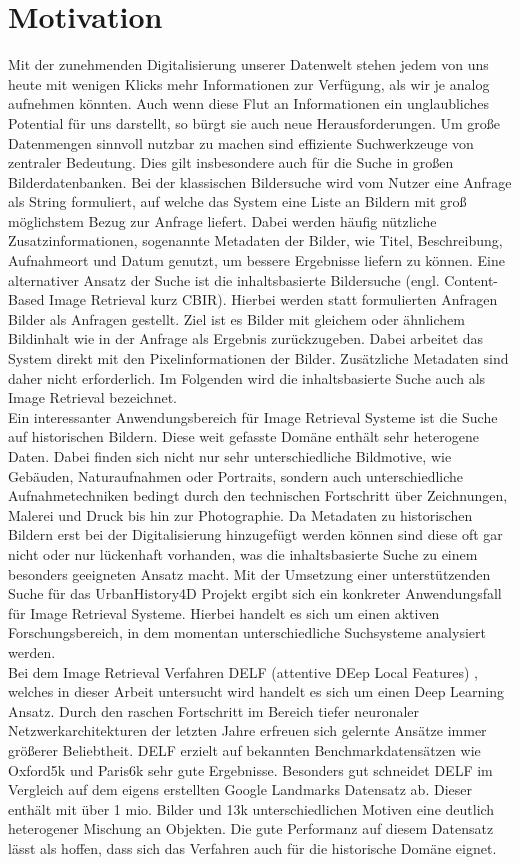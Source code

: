 \section*{Motivation}
Mit der zunehmenden Digitalisierung unserer Datenwelt stehen jedem von uns heute mit wenigen Klicks mehr Informationen zur Verfügung, als wir je analog aufnehmen könnten. Auch wenn diese Flut an Informationen ein unglaubliches Potential für uns darstellt, so bürgt sie auch neue Herausforderungen. Um große Datenmengen sinnvoll nutzbar zu machen sind effiziente Suchwerkzeuge von zentraler Bedeutung. Dies gilt insbesondere auch für die Suche in großen Bilderdatenbanken. Bei der klassischen Bildersuche wird vom Nutzer eine Anfrage als String formuliert, auf welche das System eine Liste an Bildern mit groß möglichstem Bezug zur Anfrage liefert. Dabei werden häufig nützliche  Zusatzinformationen, sogenannte Metadaten der Bilder, wie Titel, Beschreibung, Aufnahmeort und Datum genutzt, um bessere Ergebnisse liefern zu können. Eine alternativer Ansatz der Suche ist die inhaltsbasierte Bildersuche (engl. Content-Based Image Retrieval kurz CBIR). Hierbei werden statt formulierten Anfragen Bilder als Anfragen gestellt. Ziel ist es Bilder mit gleichem oder ähnlichem Bildinhalt wie in der Anfrage als Ergebnis zurückzugeben. Dabei arbeitet das System direkt mit den Pixelinformationen der Bilder. Zusätzliche Metadaten sind daher nicht erforderlich. Im Folgenden wird die inhaltsbasierte Suche auch als Image Retrieval bezeichnet.
\\
Ein interessanter Anwendungsbereich für Image Retrieval Systeme ist die Suche auf historischen Bildern. Diese weit gefasste Domäne enthält sehr heterogene Daten. Dabei finden sich nicht nur sehr unterschiedliche Bildmotive, wie Gebäuden, Naturaufnahmen oder Portraits, sondern auch unterschiedliche Aufnahmetechniken bedingt durch den technischen Fortschritt über Zeichnungen, Malerei und Druck bis hin zur Photographie. Da Metadaten zu historischen Bildern erst bei der Digitalisierung hinzugefügt werden können sind diese oft gar nicht oder nur lückenhaft vorhanden, was die inhaltsbasierte Suche zu einem besonders geeigneten Ansatz macht. Mit der Umsetzung einer unterstützenden Suche für das UrbanHistory4D Projekt \cite{urbanhistory4d} ergibt sich ein konkreter Anwendungsfall für Image Retrieval Systeme. Hierbei handelt es sich um einen aktiven Forschungsbereich, in dem momentan unterschiedliche Suchsysteme analysiert werden. 
\\
Bei dem Image Retrieval Verfahren DELF (attentive DEep Local Features) \cite{delf}, welches in dieser Arbeit untersucht wird handelt es sich um einen Deep Learning Ansatz. Durch den raschen Fortschritt im Bereich tiefer neuronaler Netzwerkarchitekturen der letzten Jahre erfreuen sich gelernte Ansätze immer größerer Beliebtheit. DELF erzielt auf bekannten Benchmarkdatensätzen wie Oxford5k \cite{oxford5k} und Paris6k \cite{paris6k} sehr gute Ergebnisse. Besonders gut schneidet DELF im Vergleich auf dem eigens erstellten Google Landmarks Datensatz \cite{landmarks} ab. Dieser enthält mit über 1 mio. Bilder und 13k unterschiedlichen Motiven eine deutlich heterogener Mischung an Objekten. Die gute Performanz auf diesem Datensatz lässt als hoffen, dass sich das Verfahren auch für die historische Domäne eignet.



